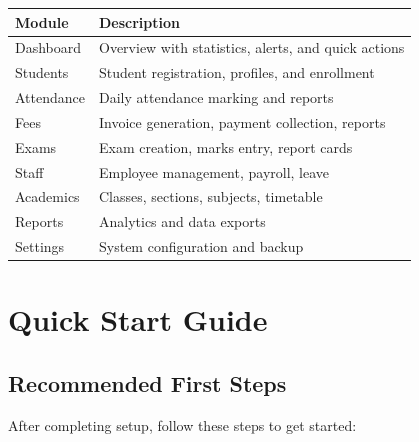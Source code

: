 \documentclass[12pt,a4paper]{report}
\begin{document}
\begin{longtable}{@{}p{3cm}p{10cm}@{}}
\toprule
\textbf{Module} & \textbf{Description} \\
\midrule
\endhead
Dashboard & Overview with statistics, alerts, and quick actions \\
Students & Student registration, profiles, and enrollment \\
Attendance & Daily attendance marking and reports \\
Fees & Invoice generation, payment collection, reports \\
Exams & Exam creation, marks entry, report cards \\
Staff & Employee management, payroll, leave \\
Academics & Classes, sections, subjects, timetable \\
Reports & Analytics and data exports \\
Settings & System configuration and backup \\
\bottomrule
\end{longtable}

\chapter{Quick Start Guide}

\section{Recommended First Steps}

After completing setup, follow these steps to get started:
\end{document}
